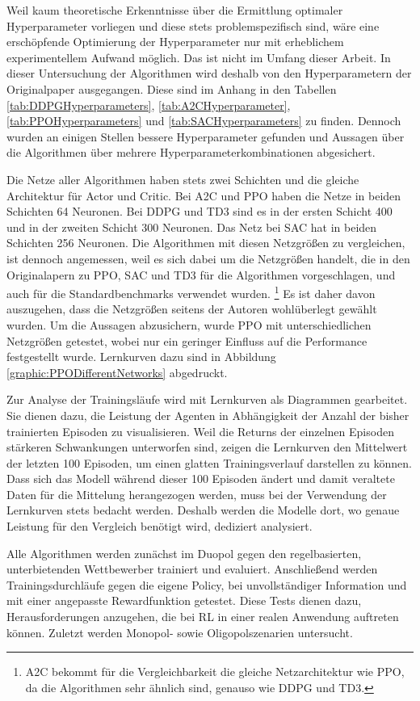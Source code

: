 Weil kaum theoretische Erkenntnisse über die Ermittlung optimaler Hyperparameter vorliegen und diese stets problemspezifisch sind, wäre eine erschöpfende Optimierung der Hyperparameter nur mit erheblichem experimentellem Aufwand möglich.
Das ist nicht im Umfang dieser Arbeit.
In dieser Untersuchung der Algorithmen wird deshalb von den Hyperparametern der Originalpaper ausgegangen.
Diese sind im Anhang in den Tabellen \ref{tab:DDPGHyperparameters}, \ref{tab:A2CHyperparameter}, \ref{tab:PPOHyperparameters} und \ref{tab:SACHyperparameters} zu finden.
Dennoch wurden an einigen Stellen bessere Hyperparameter gefunden und Aussagen über die Algorithmen über mehrere Hyperparameterkombinationen abgesichert.

Die Netze aller Algorithmen haben stets zwei Schichten und die gleiche Architektur für Actor und Critic.
Bei A2C und PPO haben die Netze in beiden Schichten 64 Neuronen.
Bei DDPG und TD3 sind es in der ersten Schicht 400 und in der zweiten Schicht 300 Neuronen.
Das Netz bei SAC hat in beiden Schichten 256 Neuronen.
Die Algorithmen mit diesen Netzgrößen zu vergleichen, ist dennoch angemessen, weil es sich dabei um die Netzgrößen handelt, die in den Originalapern zu PPO, SAC und TD3 für die Algorithmen vorgeschlagen, und auch für die Standardbenchmarks verwendet wurden. \footnote{A2C bekommt für die Vergleichbarkeit die gleiche Netzarchitektur wie PPO, da die Algorithmen sehr ähnlich sind, genauso wie DDPG und TD3.}
Es ist daher davon auszugehen, dass die Netzgrößen seitens der Autoren wohlüberlegt gewählt wurden.
Um die Aussagen abzusichern, wurde PPO mit unterschiedlichen Netzgrößen getestet, wobei nur ein geringer Einfluss auf die Performance festgestellt wurde.
Lernkurven dazu sind in Abbildung \ref{graphic:PPODifferentNetworks} abgedruckt.

Zur Analyse der Trainingsläufe wird mit Lernkurven als Diagrammen gearbeitet.
Sie dienen dazu, die Leistung der Agenten in Abhängigkeit der Anzahl der bisher trainierten Episoden zu visualisieren.
Weil die Returns der einzelnen Episoden stärkeren Schwankungen unterworfen sind, zeigen die Lernkurven den Mittelwert der letzten 100 Episoden, um einen glatten Trainingsverlauf darstellen zu können.
Dass sich das Modell während dieser 100 Episoden ändert und damit veraltete Daten für die Mittelung herangezogen werden, muss bei der Verwendung der Lernkurven stets bedacht werden.
Deshalb werden die Modelle dort, wo genaue Leistung für den Vergleich benötigt wird, dediziert analysiert.

Alle Algorithmen werden zunächst im Duopol gegen den regelbasierten, unterbietenden Wettbewerber trainiert und evaluiert.
Anschließend werden Trainingsdurchläufe gegen die eigene Policy, bei unvollständiger Information und mit einer angepasste Rewardfunktion getestet.
Diese Tests dienen dazu, Herausforderungen anzugehen, die bei RL in einer realen Anwendung auftreten können.
Zuletzt werden Monopol- sowie Oligopolszenarien untersucht.

